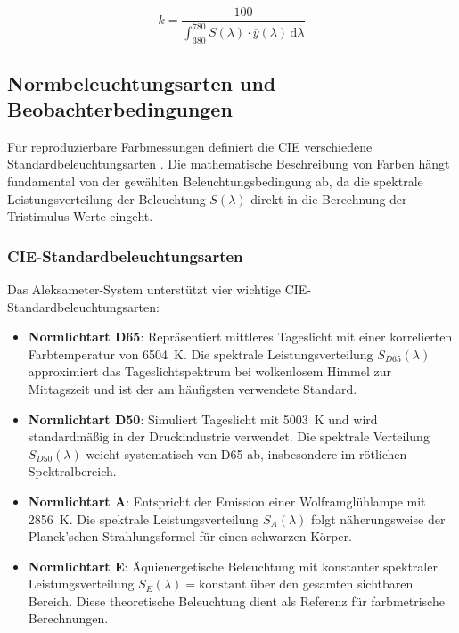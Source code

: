 \begin{equation}
k = \frac{100}{\int_{380}^{780} S(\lambda) \cdot \overline{y}(\lambda) \, \mathrm{d}\lambda}
\label{eq:normierungsfaktor}
\end{equation}

\subsection{Normbeleuchtungsarten und Beobachterbedingungen}

Für reproduzierbare Farbmessungen definiert die CIE verschiedene Standardbeleuchtungsarten \parencite{CIE015}. Die mathematische Beschreibung von Farben hängt fundamental von der gewählten Beleuchtungsbedingung ab, da die spektrale Leistungsverteilung der Beleuchtung $S(\lambda)$ direkt in die Berechnung der Tristimulus-Werte eingeht.

\subsubsection{CIE-Standardbeleuchtungsarten}

Das Aleksameter-System unterstützt vier wichtige CIE-Standardbeleuchtungsarten:

\begin{itemize}
    \item \textbf{Normlichtart D65}: Repräsentiert mittleres Tageslicht mit einer korrelierten Farbtemperatur von \SI{6504}{\kelvin}. Die spektrale Leistungsverteilung $S_{D65}(\lambda)$ approximiert das Tageslichtspektrum bei wolkenlosem Himmel zur Mittagszeit und ist der am häufigsten verwendete Standard.
    
    \item \textbf{Normlichtart D50}: Simuliert Tageslicht mit \SI{5003}{\kelvin} und wird standardmäßig in der Druckindustrie verwendet. Die spektrale Verteilung $S_{D50}(\lambda)$ weicht systematisch von D65 ab, insbesondere im rötlichen Spektralbereich.
    
    \item \textbf{Normlichtart A}: Entspricht der Emission einer Wolframglühlampe mit \SI{2856}{\kelvin}. Die spektrale Leistungsverteilung $S_A(\lambda)$ folgt näherungsweise der Planck'schen Strahlungsformel für einen schwarzen Körper.
    
    \item \textbf{Normlichtart E}: Äquienergetische Beleuchtung mit konstanter spektraler Leistungsverteilung $S_E(\lambda) = \text{konstant}$ über den gesamten sichtbaren Bereich. Diese theoretische Beleuchtung dient als Referenz für farbmetrische Berechnungen.
\end{itemize}


